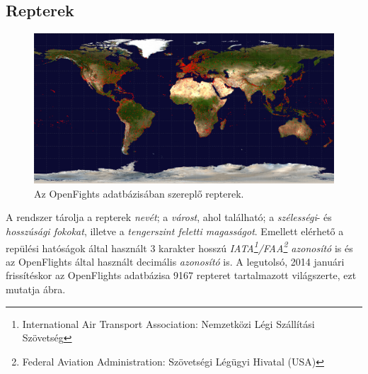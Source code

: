     \subsection{Repterek}
    \begin{figure}[!ht]
      \centering
      \includegraphics[width=150mm,keepaspectratio=true]{./figures/airports-2048.png}

      \caption{Az OpenFights adatbázisában szereplő repterek.}
      \label{fig:figure_repterek}
    \end{figure}

    A rendszer tárolja a repterek \textit{nevét}; a \textit{várost}, ahol található; a \textit{szélességi}- és \textit{hosszúsági fokokat}, illetve a \textit{tengerszint feletti magasságot}. Emellett elérhető a repülési hatóságok által használt 3 karakter hosszú \textit{IATA\footnote{International Air Transport Association: Nemzetközi Légi Szállítási Szövetség}/FAA\footnote{Federal Aviation Administration: Szövetségi Légügyi Hivatal (USA)} azonosító} is és az OpenFlights által használt decimális \textit{azonosító} is. A legutolsó, 2014 januári frissítéskor az OpenFlights adatbázisa 9167 repteret tartalmazott világszerte, ezt mutatja  ábra.

